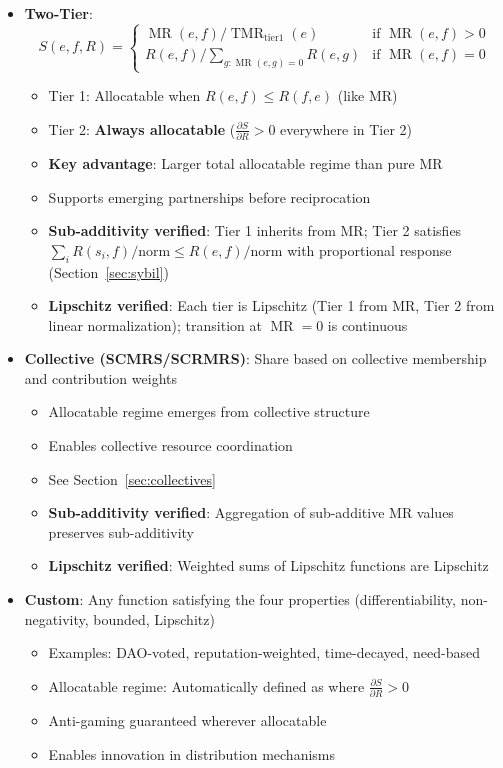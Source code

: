\documentclass[11pt,a4paper]{article}
\theoremstyle{definition}
\theoremstyle{remark}
\DeclareMathOperator{\TMR}{TMR}
\DeclareMathOperator{\MR}{MR}
\begin{document}
\begin{itemize}
\item \textbf{Two-Tier}: 
  \[ S(e,f,R) = \begin{cases}
    \MR(e,f) / \TMR_{\text{tier1}}(e) & \text{if } \MR(e,f) > 0 \\
    R(e,f) / \sum_{g:\MR(e,g)=0} R(e,g) & \text{if } \MR(e,f) = 0
  \end{cases} \]
  \begin{itemize}
  \item Tier 1: Allocatable when $R(e,f) \le R(f,e)$ (like MR)
  \item Tier 2: \textbf{Always allocatable} ($\frac{\partial S}{\partial R} > 0$ everywhere in Tier 2)
  \item \textbf{Key advantage}: Larger total allocatable regime than pure MR
  \item Supports emerging partnerships before reciprocation
  \item \textbf{Sub-additivity verified}: Tier 1 inherits from MR; Tier 2 satisfies $\sum_i R(s_i,f)/\text{norm} \le R(e,f)/\text{norm}$ with proportional response (Section~\ref{sec:sybil})
  \item \textbf{Lipschitz verified}: Each tier is Lipschitz (Tier 1 from MR, Tier 2 from linear normalization); transition at $\MR=0$ is continuous
  \end{itemize}

\item \textbf{Collective (SCMRS/SCRMRS)}: Share based on collective membership and contribution weights
  \begin{itemize}
  \item Allocatable regime emerges from collective structure
  \item Enables collective resource coordination
  \item See Section~\ref{sec:collectives}
  \item \textbf{Sub-additivity verified}: Aggregation of sub-additive MR values preserves sub-additivity
  \item \textbf{Lipschitz verified}: Weighted sums of Lipschitz functions are Lipschitz
  \end{itemize}

\item \textbf{Custom}: Any function satisfying the four properties (differentiability, non-negativity, bounded, Lipschitz)
  \begin{itemize}
  \item Examples: DAO-voted, reputation-weighted, time-decayed, need-based
  \item Allocatable regime: Automatically defined as where $\frac{\partial S}{\partial R} > 0$
  \item Anti-gaming guaranteed wherever allocatable
  \item Enables innovation in distribution mechanisms
  \end{itemize}
\end{itemize}
\end{document}
